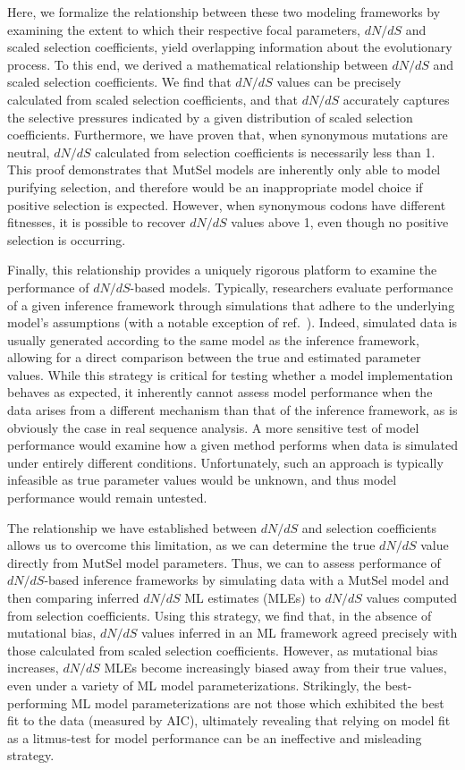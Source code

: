 \documentclass[11pt]{article}
\begin{document}
Here, we formalize the relationship between these two modeling frameworks by examining the extent to which their respective focal parameters, $dN/dS$ and scaled selection coefficients, yield overlapping information about the evolutionary process. To this end, we derived a mathematical relationship between $dN/dS$ and scaled selection coefficients. We find that $dN/dS$ values can be precisely calculated from scaled selection coefficients, and that $dN/dS$ accurately captures the selective pressures indicated by a given distribution of scaled selection coefficients. Furthermore, we have proven that, when synonymous mutations are neutral, $dN/dS$ calculated from selection coefficients is necessarily less than 1. This proof demonstrates that MutSel models are inherently only able to model purifying selection, and therefore would be an inappropriate model choice if positive selection is expected. However, when synonymous codons have different fitnesses, it is possible to recover $dN/dS$ values above 1, even though no positive selection is occurring. 

Finally, this relationship provides a uniquely rigorous platform to examine the performance of $dN/dS$-based models. Typically, researchers evaluate performance of a given inference framework through simulations that adhere to the underlying model's assumptions (with a notable exception of ref.\ \cite{Holder2008}). Indeed, simulated data is usually generated according to the same model as the inference framework, allowing for a direct comparison between the true and estimated parameter values. While this strategy is critical for testing whether a model implementation behaves as expected, it inherently cannot assess model performance when the data arises from a different mechanism than that of the inference framework, as is obviously the case in real sequence analysis. A more sensitive test of model performance would examine how a given method performs when data is simulated under entirely different conditions. Unfortunately, such an approach is typically infeasible as true parameter values would be unknown, and thus model performance would remain untested. 

The relationship we have established between $dN/dS$ and selection coefficients allows us to overcome this limitation, as we can determine the true $dN/dS$ value directly from MutSel model parameters. Thus, we can to assess performance of $dN/dS$-based inference frameworks by simulating data with a MutSel model and then comparing inferred $dN/dS$ ML estimates (MLEs) to $dN/dS$ values computed from selection coefficients. Using this strategy, we find that, in the absence of mutational bias, $dN/dS$ values inferred in an ML framework agreed precisely with those calculated from scaled selection coefficients. However, as mutational bias increases, $dN/dS$ MLEs become increasingly biased away from their true values, even under a variety of ML model parameterizations. Strikingly, the best-performing ML model parameterizations are not those which exhibited the best fit to the data (measured by AIC), ultimately revealing that relying on model fit as a litmus-test for model performance can be an ineffective and misleading strategy. 
\end{document}
